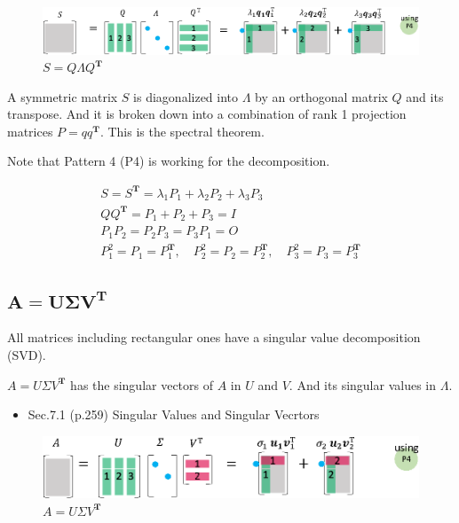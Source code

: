 \documentclass[letterpaper]{article}
\begin{document}
\begin{figure}[H]
  \includegraphics[keepaspectratio, width=\linewidth]{EVD.eps}
  \caption{$S=Q \Lambda Q^\mathbf{T}$}
\end{figure}

A symmetric matrix $S$ is diagonalized into $\Lambda$  by an orthogonal matrix $Q$
and its transpose. And it is broken down into a combination of rank 1 projection matrices $P=qq^\mathbf{T}$.
This is the spectral theorem.

Note that Pattern 4 (P4) is working for the decomposition.

\begin{gather*}
  S=S^\mathbf{T} = \lambda_1 P_1 + \lambda_2 P_2 + \lambda_3 P_3\\
  QQ^\mathbf{T} = P_1 + P_2 + P_3 = I \\
  P_1 P_2 = P_2 P_3 = P_3 P_1 = O\\
  P_1^2 =P_1=P_1^\mathbf{T}, \quad P_2^2=P_2=P_2^\mathbf{T}, \quad P_3^2=P_3=P_3^\mathbf{T}
\end{gather*}

\clearpage

\subsection{$\boldsymbol{A=U \Sigma V^\mathbf{T}}$}

All matrices including rectangular ones have a singular value decomposition (SVD).

$A=U \Sigma V^\mathbf{T}$ has the singular vectors of $A$ in $U$ and $V$.
And its singular values in $\Lambda$.

\begin{itemize}
  \item Sec.7.1 (p.259) Singular Values and Singular Vecrtors
\end{itemize}


\begin{figure}[H]
  \includegraphics[keepaspectratio, width=\linewidth]{SVD.eps}
  \caption{$A=U \Sigma V^\mathbf{T}$}
\end{figure}
\end{document}
